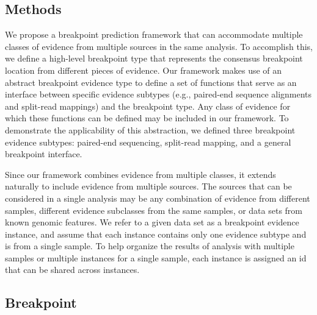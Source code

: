 \documentclass[10pt]{bmc_article}
\newenvironment{bmcformat}{\begin{raggedright}\baselineskip20pt\sloppy\setboolean{publ}{false}}{\end{raggedright}\baselineskip20pt\sloppy}
\begin{document}
\begin{bmcformat}
\section*{Methods}

We propose a breakpoint prediction framework that can accommodate multiple
classes of evidence from multiple sources in the same analysis.  To accomplish
this, we define a high-level breakpoint type that represents the consensus
breakpoint location from different pieces of evidence.  Our framework makes use
of an abstract breakpoint evidence type to define a set of functions that serve
as an interface between specific evidence subtypes (e.g., paired-end sequence
alignments and split-read mappings) and the breakpoint type.  Any class of
evidence for which these functions can be defined may be included in our
framework.  To demonstrate the applicability of this abstraction, we defined
three breakpoint evidence subtypes: paired-end sequencing, split-read mapping,
and a general breakpoint interface.

Since our framework combines evidence from multiple classes, it extends
naturally to include evidence from multiple sources.  The sources that can be
considered in a single analysis may be any combination of evidence from
different samples, different evidence subclasses from the same samples, or
data sets from known genomic features.  We refer to a given data set as a
breakpoint evidence instance, and assume that each instance contains only one
evidence subtype and is from a single sample.  To help organize the results of
analysis with multiple samples or multiple instances for a single sample,
each instance is assigned an id that can be shared across instances.


\subsection*{Breakpoint}


\end{bmcformat}
\end{document}
